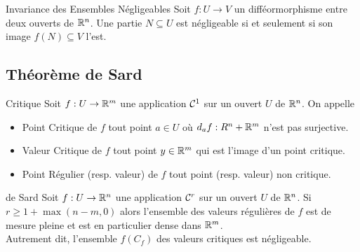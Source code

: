 \documentclass{cours}
\begin{document}
\begin{corollaire}{Invariance des Ensembles Négligeables}{}
    Soit $f : U \to V$ un difféormorphisme entre deux ouverts de $\mathbb{R}^{n}$. Une partie $N \subseteq U$ est négligeable si et seulement si son image $f(N) \subseteq V$ l'est.
\end{corollaire}

\subsection{Théorème de Sard}
\begin{définition}{Critique}{}
    Soit $f : U \to \mathbb{R}^{m}$ une application $\mathcal{C}^{1}$ sur un ouvert $U$ de $\mathbb{R}^{n}$. On appelle
    \begin{itemize}
        \item Point Critique de $f$ tout point $a \in U$ où $d_{a} f : R^{n} + \mathbb{R}^{m}$ n'est pas surjective.
        \item Valeur Critique de $f$ tout point $y \in \mathbb{R}^{m}$ qui est l'image d'un point critique.
        \item Point Régulier (resp. valeur) de $f$ tout point (resp. valeur) non critique.
    \end{itemize}
\end{définition}

\begin{théorème}{de Sard}{}
    Soit $f : U \to \mathbb{R}^{n}$ une application $\mathcal{C}^{r}$ sur un ouvert $U$ de $\mathbb{R}^{n}$. Si $r \geq 1 + \max(n - m, 0)$ alors l'ensemble des valeurs régulières de $f$ est de mesure pleine et est en particulier dense dans $\mathbb{R}^{m}$.\\
    Autrement dit, l'ensemble $f(C_{f})$ des valeurs critiques est négligeable. 
\end{théorème}
\end{document}
